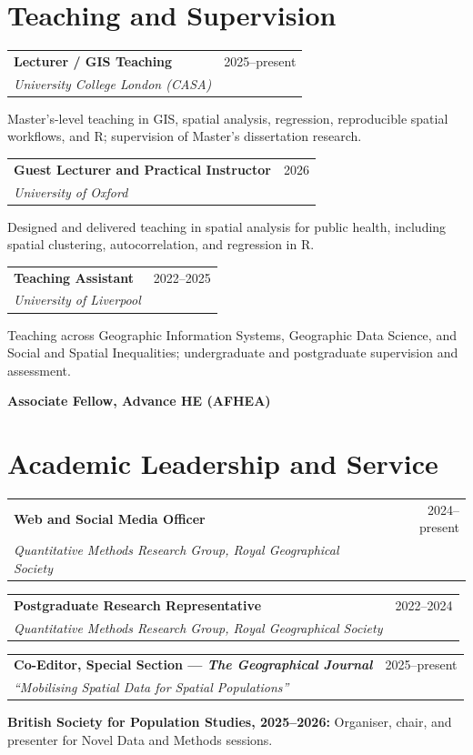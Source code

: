 \documentclass[a4paper,10.5pt]{article}
\makeatletter
\newcommand{\compactentry}[3]{%
  \vspace{3pt}
  \begin{tabular*}{\textwidth}
    {@{}p{0.80\textwidth}@{\extracolsep{\fill}}r@{}}
    {\small\textbf{#1}} &
    {\small\color{mutedtext} #3} \\[-0.5pt]
    {\small\textit{#2}} &
  \end{tabular*}
  \vspace{0.5pt}
}
\makeatother
\begin{document}
\section{Teaching and Supervision}

\compactentry
{Lecturer / GIS Teaching}
{University College London (CASA)}
{2025--present}

{\small
Master's-level teaching in GIS, spatial analysis, regression, reproducible
spatial workflows, and R; supervision of Master's dissertation research.
}

\compactentry
{Guest Lecturer and Practical Instructor}
{University of Oxford}
{2026}

{\small
Designed and delivered teaching in spatial analysis for public health,
including spatial clustering, autocorrelation, and regression in R.
}

\compactentry
{Teaching Assistant}
{University of Liverpool}
{2022--2025}

{\small
Teaching across Geographic Information Systems, Geographic Data Science,
and Social and Spatial Inequalities; undergraduate and postgraduate
supervision and assessment.
}

\vspace{3pt}

{\small
\textbf{Associate Fellow, Advance HE (AFHEA)}
}

\section{Academic Leadership and Service}

\compactentry
{Web and Social Media Officer}
{Quantitative Methods Research Group, Royal Geographical Society}
{2024--present}

\compactentry
{Postgraduate Research Representative}
{Quantitative Methods Research Group, Royal Geographical Society}
{2022--2024}

\compactentry
{Co-Editor, Special Section --- \textit{The Geographical Journal}}
{``Mobilising Spatial Data for Spatial Populations''}
{2025--present}

\vspace{3pt}

{\small
\textbf{British Society for Population Studies, 2025--2026:}
Organiser, chair, and presenter for Novel Data and Methods sessions.
}
\end{document}
